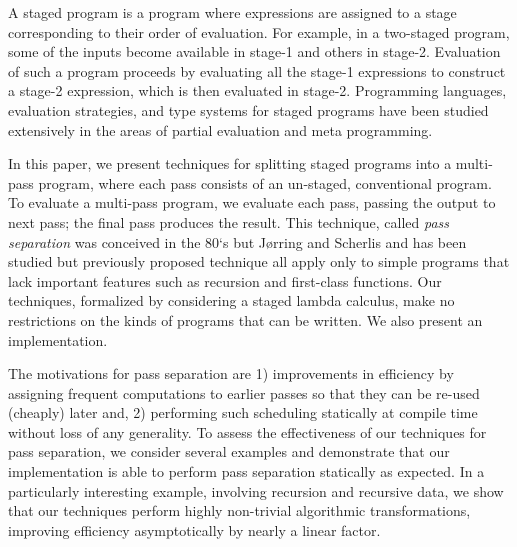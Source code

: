 A staged program is a program where expressions are assigned to a
stage corresponding to their order of evaluation.  For example, in a
two-staged program, some of the inputs become available in stage-1 and
others in stage-2.  Evaluation of such a program proceeds by
evaluating all the stage-1 expressions to construct a stage-2
expression, which is then evaluated in stage-2.  Programming
languages, evaluation strategies, and type systems for staged programs
have been studied extensively in the areas of partial evaluation and
meta programming.

In this paper, we present techniques for splitting staged programs
into a multi-pass program, where each pass consists of an un-staged,
conventional program.  To evaluate a multi-pass program, we evaluate
each pass, passing the output to next pass; the final pass produces
the result.  This technique, called {\em pass separation} was
conceived in the 80`s but J{\o}rring and Scherlis and has been studied
but previously proposed technique all apply only to simple programs
that lack important features such as recursion and first-class
functions.  Our techniques, formalized by considering a staged lambda
calculus, make no restrictions on the kinds of programs that can be
written.  We also present an implementation. 

The motivations for pass separation are 1) improvements in efficiency
by assigning frequent computations to earlier passes so that they can
be re-used (cheaply) later and, 2) performing such scheduling
statically at compile time without loss of any generality.  To assess
the effectiveness of our techniques for pass separation, we consider
several examples and demonstrate that our implementation is able to
perform pass separation statically as expected.  In a particularly
interesting example, involving recursion and recursive data, we show
that our techniques perform highly non-trivial algorithmic
transformations, improving efficiency asymptotically by nearly a
linear factor.







